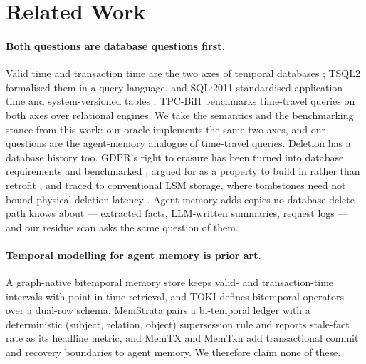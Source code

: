 \documentclass[conference]{IEEEtran}
\begin{document}
\section{Related Work}

\paragraph{Both questions are database questions first.}
Valid time and transaction time are the two axes of temporal databases
\citep{snodgrass1985,jensen1999temporal}; TSQL2 \citep{snodgrass1995tsql2} formalised them in a query language,
and SQL:2011 standardised application-time and system-versioned tables
\citep{kulkarni2012sql2011}. TPC-BiH
\citep{kaufmann2013tpcbih} benchmarks time-travel queries on both axes over
relational engines. We take the semantics and the benchmarking stance from this
work: our oracle implements the same two axes, and our questions are the
agent-memory analogue of time-travel queries. Deletion has a database history
too. GDPR's right to erasure has been turned into database requirements and
benchmarked \citep{shastri2020gdpr}, argued for as a property to build in rather
than retrofit \citep{schwarzkopf2019gdpr}, and traced to conventional LSM storage, where
tombstones need not bound physical deletion latency
\citep{sarkar2020lethe}. Agent memory adds copies no database delete path knows
about --- extracted facts, LLM-written summaries, request logs --- and our
residue scan asks the same question of them.

\paragraph{Temporal modelling for agent memory is prior art.}
A graph-native bitemporal memory store \citep{graphnativebitemporal} keeps valid- and transaction-time
intervals with point-in-time retrieval, and TOKI \citep{toki} defines bitemporal operators
over a dual-row schema. MemStrata \citep{memstrata} pairs a bi-temporal ledger
with a deterministic (subject, relation, object) supersession rule and reports
stale-fact rate as its headline metric, and MemTX \citep{memtx} and MemTxn
\citep{memtxn} add transactional commit and recovery boundaries to agent memory.
We therefore claim none of these.
\end{document}
